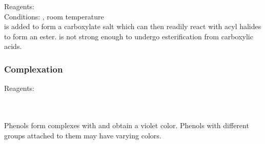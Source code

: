 \documentclass[../main]{subfiles}
\begin{document}
	Reagents:  \\
	Conditions: , room temperature \\

	 is added to form a carboxylate salt which can then readily react with acyl halides to form an ester.  is not strong enough to undergo esterification from carboxylic acids. \\

	\subsubsection{Complexation}

	Reagents:  \\

	 \\
	 \\

	\vspace{12pt}

	Phenols form complexes with  and obtain a violet color. Phenols with different groups attached to them may have varying colors.

	
\end{document}
